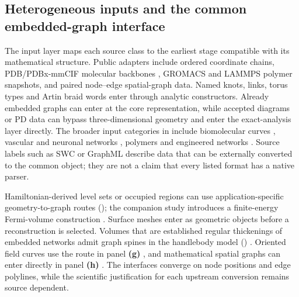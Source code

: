 \documentclass[10pt,twocolumn]{article}
\begin{document}
\subsection{Heterogeneous inputs and the common embedded-graph interface}
\label{supp:input_examples}
The input layer maps each source class to the earliest stage compatible with its mathematical structure. Public adapters include ordered coordinate chains, PDB/PDBx-mmCIF molecular backbones \cite{kg_burley2019rcsb,kg_bourne1997mmcif}, GROMACS \cite{kg_abraham2015gromacs} and LAMMPS \cite{kg_thompson2022lammps} polymer snapshots, and paired node--edge spatial-graph data. Named knots, links, torus types and Artin braid words enter through analytic constructors. Already embedded graphs can enter at the core representation, while accepted diagrams or PD data can bypass three-dimensional geometry and enter the exact-analysis layer directly. The broader input categories in  include biomolecular curves \cite{kg_yeates2007protein_topology}, vascular and neuronal networks \cite{kg_aylward2005spatial_vascular,kg_cuntz2010neuronal_graphs}, polymers \cite{kg_deguchi2017topological_polymers} and engineered networks \cite{kg_shai1999engineering_graphs,kg_peddada2023}. Source labels such as SWC or GraphML describe data that can be externally converted to the common object; they are not a claim that every listed format has a native parser.

Hamiltonian-derived level sets or occupied regions can use application-specific geometry-to-graph routes (); the companion study introduces a finite-energy Fermi-volume construction \cite{akgun_yan_2026topologicalclassificationknottedgraphs}. Surface meshes enter as geometric objects before a reconstruction is selected. Volumes that are established regular thickenings of embedded networks admit graph spines in the handlebody model () \cite{kg_ishii2008handlebody,kg_ishii2012handlebody}. Oriented field curves use the route in panel \textbf{(g)} \cite{kg_helman1989vector_field_topology}, and mathematical spatial graphs can enter directly in panel \textbf{(h)} \cite{kg_kauffman1989spatial,kg_flapan2017spatial}. The interfaces converge on node positions and edge polylines, while the scientific justification for each upstream conversion remains source dependent.
\end{document}
